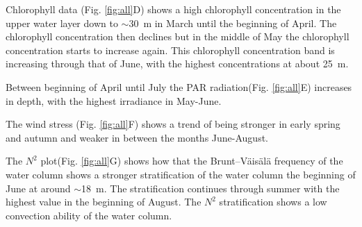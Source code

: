 \documentclass[../Main.tex]{subfiles}
\begin{document}
Chlorophyll data (Fig. \ref{fig:all}D) shows a high chlorophyll concentration in the upper water layer down to $\sim$\SI{30}{\metre} in March until the beginning of April. The chlorophyll concentration then declines but in the middle of May the chlorophyll concentration starts to increase again.
This chlorophyll concentration band is increasing through that of June, with the highest concentrations at about \SI{25}{\metre}.

Between beginning of April until July the PAR radiation(Fig. \ref{fig:all}E) increases in depth, with the highest irradiance in May-June.

The wind stress (Fig. \ref{fig:all}F) shows a trend of being stronger in early spring and autumn and weaker in between the months June-August.

The $N^2$ plot(Fig. \ref{fig:all}G) shows how that the Brunt–Väisälä frequency of the water column shows a stronger stratification of the water column the beginning of June at around  $\sim$\SI{18}{\metre}. The stratification continues through summer with the highest value in the beginning of August. The $N^2$ stratification shows a low convection ability of the water column. 
\end{document}
